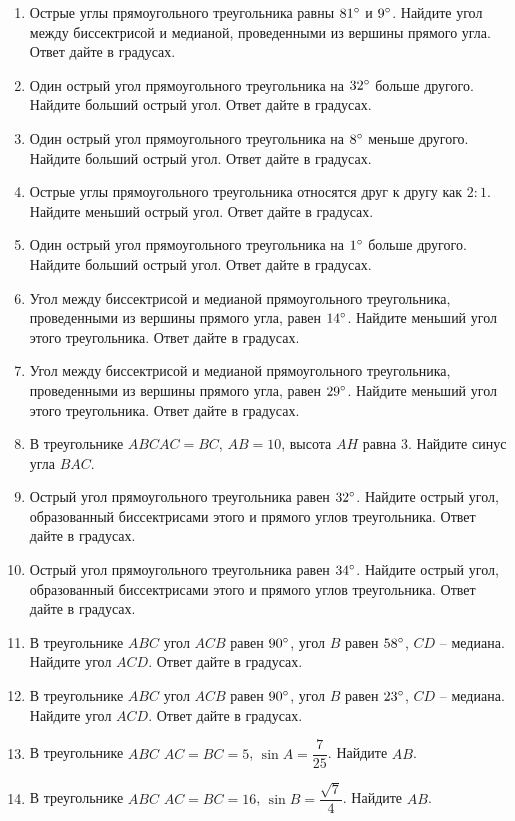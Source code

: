 \documentclass[12pt, a4paper]{article}
\begin{document}
\begin{enumerate}
		\item Острые углы прямоугольного треугольника равны \( 81\degree \) и \( 9\degree \). Найдите угол между биссектрисой и медианой, проведенными из вершины прямого угла. Ответ дайте в градусах.
		\item Один острый угол прямоугольного треугольника на \( 32\degree \) больше другого. Найдите больший острый угол. Ответ дайте в градусах.
		\item Один острый угол прямоугольного треугольника на \( 8\degree \) меньше другого. Найдите больший острый угол. Ответ дайте в градусах.
		\item Острые углы прямоугольного треугольника относятся друг к другу как \( 2:1 \). Найдите меньший острый угол. Ответ дайте в градусах.
		\item Один острый угол прямоугольного треугольника на \( 1\degree \) больше другого. Найдите больший острый угол. Ответ дайте в градусах.
		\item Угол между биссектрисой и медианой прямоугольного треугольника, проведенными из вершины прямого угла, равен \( 14\degree \). Найдите меньший угол этого треугольника. Ответ дайте в градусах.
		\item Угол между биссектрисой и медианой прямоугольного треугольника, проведенными из вершины прямого угла, равен \( 29\degree \). Найдите меньший угол этого треугольника. Ответ дайте в градусах.
		\item В треугольнике \( ABC AC=BC\), \(AB=10\), высота \(AH\) равна \(3\). Найдите синус угла \(BAC\).
		\item Острый угол прямоугольного треугольника равен \( 32\degree \). Найдите острый угол, образованный биссектрисами этого и прямого углов треугольника. Ответ дайте в градусах.
		\item Острый угол прямоугольного треугольника равен \( 34\degree \). Найдите острый угол, образованный биссектрисами этого и прямого углов треугольника. Ответ дайте в градусах.
		\item В треугольнике \( ABC \) угол \( ACB \) равен \( 90\degree \), угол \( B \) равен \( 58 \degree\), \( CD \) – медиана. Найдите угол \( ACD \). Ответ дайте в градусах.
		\item В треугольнике \( ABC \) угол \( ACB \) равен \( 90\degree \), угол \( B \) равен \( 23\degree \), \( CD \) – медиана. Найдите угол \( ACD \). Ответ дайте в градусах.
		\item В треугольнике \( ABC \) \(AC=BC=5\),  \( \sin A=\dfrac{7}{25} \).  Найдите \( AB \).
		\item В треугольнике  \( ABC \) \(AC=BC=16\),  \( \sin B=\dfrac{\sqrt{7}}{4} \).  Найдите \( AB \).

\end{enumerate}
\end{document}
